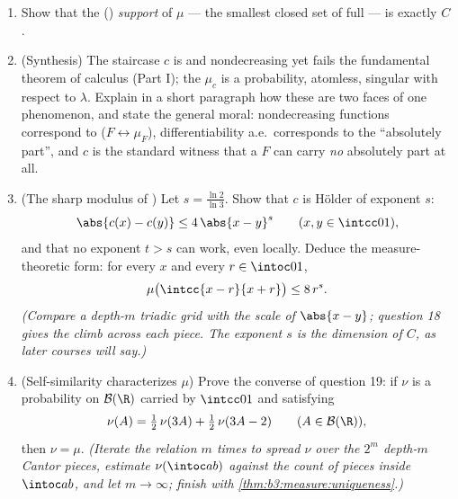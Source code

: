 \begin{problem}
\begin{enumerate}[resume]
        spreads \emph{more}.
  \item Show that the () \emph{support} of $\mu$
        --- the smallest closed set of full  --- is
        exactly $C$.
  \item (Synthesis) The staircase $c$ is  and
        nondecreasing yet fails the fundamental theorem of
        calculus (Part I); the  $\mu_c$ is a
        probability, atomless, singular with respect to
        $\lambda$. Explain in a short paragraph how these are
        two faces of one phenomenon, and state the general
        moral: nondecreasing functions correspond to 
        ($F \leftrightarrow \mu_F$), differentiability a.e.\
        corresponds to the ``absolutely  part'', and
        $c$ is the standard witness that a  $F$ can
        carry \emph{no} absolutely \omterm{def:b3:topology:continuity}{continuous} part at all.
  \item (The sharp modulus of \omterm{def:b3:topology:continuity}{continuity}) Let $s =
        \frac{\ln 2}{\ln 3}$. Show that $c$ is H\"older
         of exponent $s$:
        \[
        \abs{c(x) - c(y)} \leq 4\,\abs{x - y}^{s}
        \qquad (x, y \in \intcc01),
        \]
        and that no exponent $t > s$ can work, even locally.
        Deduce the measure-theoretic form: for every $x$ and
        every $r \in \intoc01$,
        \[
        \mu\bigl(\intcc{x - r}{x + r}\bigr) \leq 8\,r^{s} .
        \]
        \emph{(Compare a depth-$m$ triadic grid with the scale
        of $\abs{x - y}$; question 18 gives the climb across
        each piece. The exponent $s$ is the  dimension
        of $C$, as later courses will say.)}
  \item (Self-similarity characterizes $\mu$) Prove the
        converse of question 19: if $\nu$ is a probability
         on $\mathcal B(\R)$ carried by $\intcc01$ and
        satisfying
        \[
        \nu(A) = \tfrac12\,\nu(3A) + \tfrac12\,\nu(3A - 2)
        \qquad (A \in \mathcal B(\R)),
        \]
        then $\nu = \mu$. \emph{(Iterate the relation $m$
        times to spread $\nu$ over the $2^m$ depth-$m$ Cantor
        pieces, estimate $\nu(\intoc ab)$ against the count of
        pieces inside $\intoc ab$, and let $m \to \infty$;
        finish with \cref{thm:b3:measure:uniqueness}.)}
\end{enumerate}
\end{problem}
